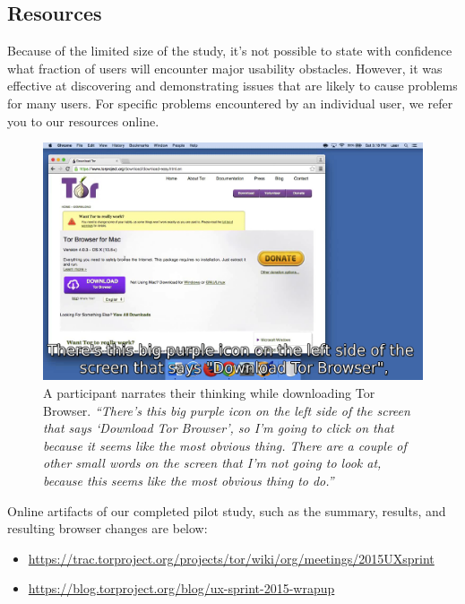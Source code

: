 \documentclass[letterpaper,twocolumn,11pt]{article}
\begin{document}
\subsection{Resources}

\indent \indent Because of the limited size of the study, it's not possible to state with confidence what 
fraction of users will encounter major usability obstacles. However, it was effective at discovering 
and demonstrating issues that are likely to cause problems for many users. For specific problems 
encountered by an individual user, we refer you to our resources online. 

\begin{figure}
\includegraphics[width=\linewidth]{walkthrough.png}
\caption{
A participant narrates their thinking
while downloading Tor Browser.
{
\it
``There's this big purple icon on the left side of the screen that says `Download Tor Browser',
so I'm going to click on that because it seems like the most obvious thing.
There are a couple of other small words on the screen that I'm not going to look at, because this seems like the most obvious thing to do.''
}
}
\label{walkthrough}
\end{figure}

\indent \indent  Online artifacts of our completed pilot study, such as 
the summary, results, and resulting browser changes are below:
\begin{itemize} \itemsep1pt \parskip0pt 
\item \url{https://trac.torproject.org/projects/tor/wiki/org/meetings/2015UXsprint}
\item \url{https://blog.torproject.org/blog/ux-sprint-2015-wrapup}
\end{itemize}
\end{document}
